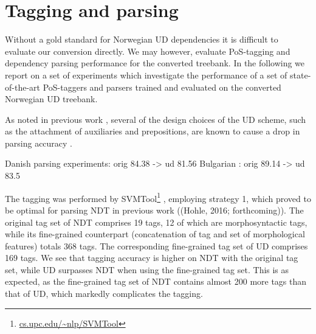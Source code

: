 \documentclass[10pt, a4paper]{article}
\begin{document}



\section{Tagging and parsing}
Without a gold standard for Norwegian UD dependencies it is difficult
to evaluate our conversion directly. We may however, evaluate
PoS-tagging and dependency parsing performance for the converted
treebank.  In the following we report on a set of experiments which
investigate the performance of a set of state-of-the-art PoS-taggers
and parsers trained and evaluated on the converted Norwegian UD
treebank.

As noted in previous work \cite{Mar:Doz:Sil:14}, several of the design
choices of the UD scheme, such as the attachment of auxiliaries and
prepositions, are known to cause a drop in parsing accuracy
\cite{Sch:Abe:Rap:12}.

Danish parsing experiments: \cite{Joh:Alo:Pla:15} orig 84.38 -> ud 81.56
Bulgarian \cite{Ose:Sim:15}: orig 89.14 -> ud 83.5

The tagging was performed by SVMTool\footnote{\url{cs.upc.edu/~nlp/SVMTool}}
\cite{Gim:Mar:04}, employing strategy 1, which proved to be optimal for parsing
NDT in previous work ((Hohle, 2016; forthcoming)). The original tag set of NDT
comprises 19 tags, 12 of which are morphosyntactic tags, while its fine-grained
counterpart (concatenation of tag and set of morphological features) totals 368
tags. The corresponding fine-grained tag set of UD comprises 169 tags. We see
that tagging accuracy is higher on NDT with the original tag set, while UD
surpasses NDT when using the fine-grained tag set. This is as expected, as the
fine-grained tag set of NDT contains almost 200 more tags than that of UD,
which markedly complicates the tagging.

\end{document}
